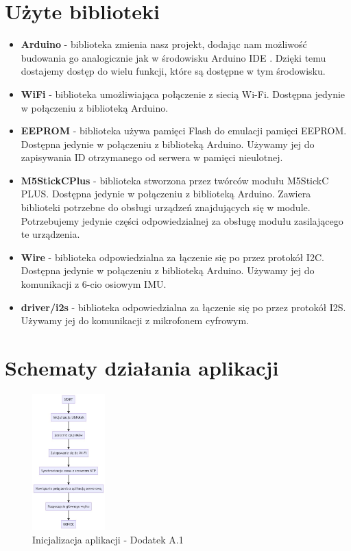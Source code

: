 \documentclass[12pt,oneside,a4paper]{book}
\theoremstyle{break}
\begin{document}
\section{Użyte biblioteki}

\begin{itemize}
\item \textbf{Arduino\cite{arduinoh}} - biblioteka zmienia nasz projekt, dodając nam możliwość
    budowania go analogicznie jak w środowisku Arduino IDE \cite{arduino}. Dzięki temu dostajemy dostęp
    do wielu funkcji, które są dostępne w tym środowisku. 
\item \textbf{WiFi\cite{wifi-h}} - biblioteka umożliwiająca połączenie z siecią Wi-Fi. Dostępna
    jedynie w połączeniu z biblioteką Arduino.
\item \textbf{EEPROM\cite{eeprom.h}} - biblioteka używa pamięci Flash do emulacji pamięci EEPROM. Dostępna
    jedynie w połączeniu z biblioteką Arduino. Używamy jej do zapisywania ID otrzymanego od serwera w
    pamięci nieulotnej.
\item \textbf{M5StickCPlus\cite{m5stick.h}} - biblioteka stworzona przez twórców modułu M5StickC PLUS. Dostępna jedynie
    w połączeniu z biblioteką Arduino. Zawiera biblioteki potrzebne do obsługi
    urządzeń znajdujących się w module. Potrzebujemy
    jedynie części odpowiedzialnej za obsługę modułu zasilającego te urządzenia.
\item \textbf{Wire\cite{wire.h}} - biblioteka odpowiedzialna za łączenie się po przez protokół I2C. 
    Dostępna jedynie w połączeniu z biblioteką Arduino. Używamy jej do komunikacji z 6-cio osiowym IMU.
\item \textbf{driver/i2s\cite{driver.h}} - biblioteka odpowiedzialna za łączenie się po przez protokół I2S. 
    Używamy jej do komunikacji z mikrofonem cyfrowym.
\end{itemize}

\section{Schematy działania aplikacji}

\begin{figure}[H]
    \begin{center}
        \includegraphics[width=0.25\textwidth]{uc-init}
        \caption{Inicjalizacja aplikacji - Dodatek A.1}        
        \label{rys:uc-init}
    \end{center}
\end{figure}
\end{document}
